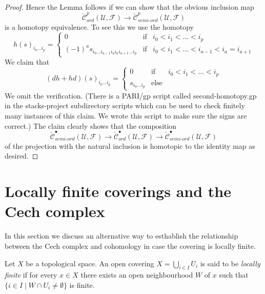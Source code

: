 \begin{proof}
\medskip\noindent
Hence the Lemma follows if we can show that the obvious inclusion map
$$
\check{\mathcal{C}}_{ord}^p(\mathcal{U}, \mathcal{F})
\longrightarrow
\check{\mathcal{C}}_{semi\text{-}ord}^p(\mathcal{U}, \mathcal{F})
$$
is a homotopy equivalence. To see this we use the homotopy
\begin{equation}
\label{equation-second-homotopy}
h(s)_{i_0 \ldots i_p} =
\left\{
\begin{matrix}
0 & \text{if} & i_0 < i_1 < \ldots < i_p \\
(-1)^a s_{i_0 \ldots i_{a - 1} i_a i_a i_{a + 1} \ldots i_p}
& \text{if} & i_0 < i_1 < \ldots < i_{a - 1} < i_a = i_{a + 1}
\end{matrix}
\right.
\end{equation}
We claim that
$$
(dh + hd)(s)_{i_0 \ldots i_p} =
\left\{
\begin{matrix}
0 & \text{if} & i_0 < i_1 < \ldots < i_p \\
s_{i_0 \ldots i_p}
& \text{else} &
\end{matrix}
\right.
$$
We omit the verification. (There is a PARI/gp script called second-homotopy.gp
in the stacks-project subdirectory scripts which can be used to check
finitely many instances of this claim.
We wrote this script to make sure the signs are correct.)
The claim clearly shows that the composition
$$
\check{\mathcal{C}}_{semi\text{-}ord}^\bullet(\mathcal{U}, \mathcal{F})
\longrightarrow
\check{\mathcal{C}}_{ord}^\bullet(\mathcal{U}, \mathcal{F})
\longrightarrow
\check{\mathcal{C}}_{semi\text{-}ord}^\bullet(\mathcal{U}, \mathcal{F})
$$
of the projection with the natural inclusion
is homotopic to the identity map as desired.
\end{proof}





\section{Locally finite coverings and the Cech complex}
\label{section-locally-finite-cech}

\noindent
In this section we discuss an alternative way to esthablish the relationship
between the Cech complex and cohomology in case the covering is locally
finite.

\begin{definition}
\label{definition-covering-locally-finite}
Let $X$ be a topological space.
An open covering $X = \bigcup_{i \in I} U_i$ is said to be
{\it locally finite} if for every $x \in X$ there exists an open neighbourhood
$W$ of $x$ such that $\{i \in I \mid W \cap U_i \not = \emptyset\}$ is finite.
\end{definition}

